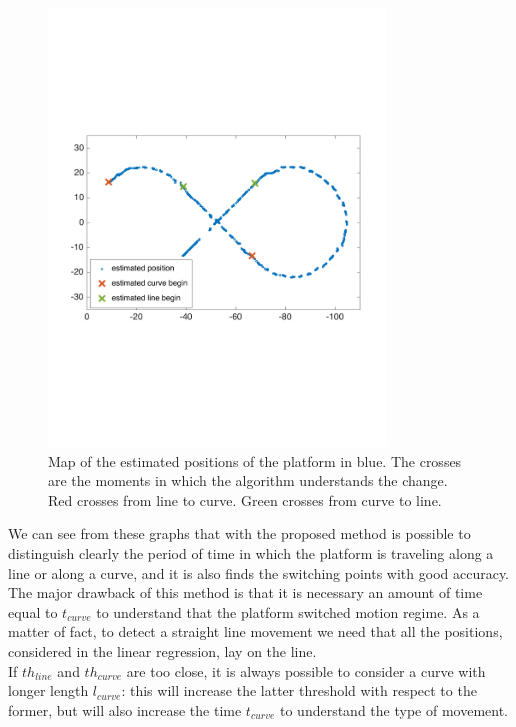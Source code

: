 \begin{figure}[!htbp]
    \centering
    \includegraphics[width=0.8\textwidth]{img/following_platform_for_long_map_simple.pdf}
    \caption{Map of the estimated positions of the platform in blue. The crosses are the moments in which the algorithm understands the change. Red crosses from line to curve. Green crosses from curve to line.}
    \label{fig:error_regression_map}
\end{figure}

We can see from these graphs that with the proposed method is possible to distinguish clearly the period of time in which the platform is traveling along a line or along a curve, and it is also finds the switching points with good accuracy.\\ 
The major drawback of this method is that it is necessary an amount of time equal to $t_{curve}$ to understand that the platform switched motion regime. As a matter of fact, to detect a straight line movement we need that all the positions, considered in the linear regression, lay on the line.  \\
If  $th_{line}$ and  $th_{curve}$ are too close, it is always possible to consider a curve with longer length $l_{curve}$: this will increase the latter threshold with respect to the former, but will also increase the time $t_{curve}$ to understand the type of movement.

